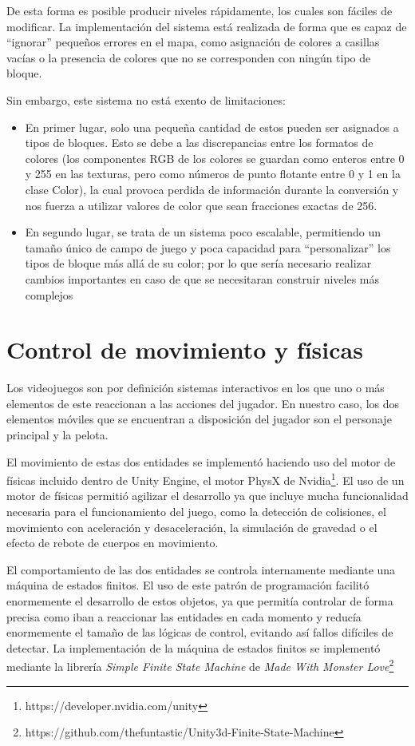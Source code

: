 De esta forma es posible producir niveles rápidamente, los cuales son fáciles de modificar. La implementación del sistema está realizada de forma que es capaz de ``ignorar'' pequeños errores en el mapa, como asignación de colores a casillas vacías o la presencia de colores que no se corresponden con ningún tipo de bloque.

Sin embargo, este sistema no está exento de limitaciones:
\begin{itemize}
  \item En primer lugar, solo una pequeña cantidad de estos pueden ser asignados a tipos de bloques. Esto se debe a las discrepancias entre los formatos de colores (los componentes RGB de los colores se guardan como enteros entre 0 y 255 en las texturas, pero como números de punto flotante entre 0 y 1 en la clase Color), la cual provoca perdida de información durante la conversión y nos fuerza a utilizar valores de color que sean fracciones exactas de 256. 
  \item En segundo lugar, se trata de un sistema poco escalable, permitiendo un tamaño único de campo de juego y poca capacidad para ``personalizar'' los tipos de bloque más allá de su color; por lo que sería necesario realizar cambios importantes en caso de que se necesitaran construir niveles más complejos
\end{itemize}

\section{Control de movimiento y físicas}
Los videojuegos son por definición sistemas interactivos en los que uno o más elementos de este reaccionan a las acciones del jugador. En nuestro caso, los dos elementos móviles que se encuentran a disposición del jugador son el personaje principal y la pelota.

El movimiento de estas dos entidades se implementó haciendo uso del motor de físicas incluido dentro de Unity Engine, el motor PhysX de Nvidia\footnote{https://developer.nvidia.com/unity}. El uso de un motor de físicas permitió agilizar el desarrollo ya que incluye mucha funcionalidad necesaria para el funcionamiento del juego, como la detección de colisiones, el movimiento con aceleración y desaceleración, la simulación de gravedad o el efecto de rebote de cuerpos en movimiento.

El comportamiento de las dos entidades se controla internamente mediante una máquina de estados finitos. El uso de este patrón de programación facilitó enormemente el desarrollo de estos objetos, ya que permitía controlar de forma precisa como iban a reaccionar las entidades en cada momento y reducía enormemente el tamaño de las lógicas de control, evitando así fallos difíciles de detectar\cite{game_programming_patterns}. La implementación de la máquina de estados finitos se implementó mediante la librería \textit{Simple Finite State Machine} de \textit{Made With Monster Love}\footnote{https://github.com/thefuntastic/Unity3d-Finite-State-Machine}

